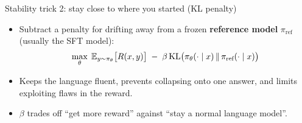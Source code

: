 \begin{frame}{Stability trick 2: stay close to where you started (KL penalty)}
\begin{itemize}\setlength{\itemsep}{8pt}
  \item Subtract a penalty for drifting away from a frozen \textbf{reference model} $\pi_{\text{ref}}$ (usually the SFT model):
  \[
    \max_\theta\; \mathbb{E}_{y\sim\pi_\theta}\big[R(x,y)\big] \;-\; \beta\,\mathrm{KL}\big(\pi_\theta(\cdot\mid x)\,\|\,\pi_{\text{ref}}(\cdot\mid x)\big)
  \]
  \item Keeps the language fluent, prevents collapsing onto one answer, and limits exploiting flaws in the reward.
  \item $\beta$ trades off ``get more reward'' against ``stay a normal language model''.
\end{itemize}
\vspace{10pt}
\end{frame}

